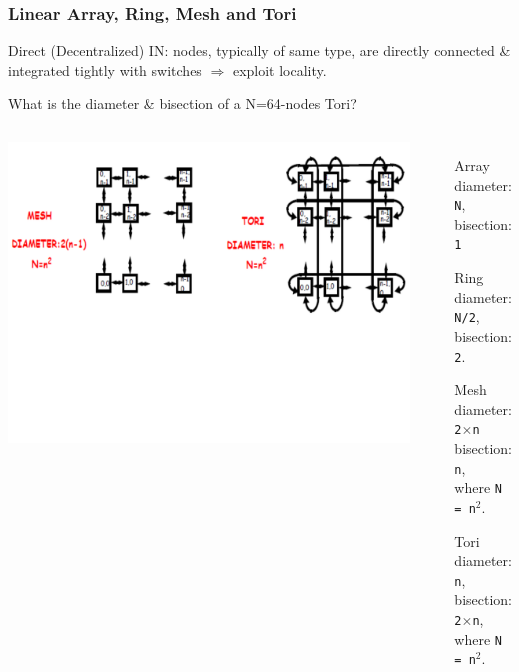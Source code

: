 \documentclass{beamer}
\renewcommand{\emph}[1]{\textcolor{structure}{#1}}
\newcommand{\emp}[1]{\textcolor{DikuRed}{ #1}}
\begin{document}
\begin{frame}[fragile,t]
\frametitle{Linear Array, Ring, Mesh and Tori}

\emp{Direct (Decentralized) IN}: nodes, typically of same type, are directly 
connected \& integrated tightly with switches $\Rightarrow$ \emph{exploit locality}.

\medskip
\alert{What is the diameter \& bisection of a N=64-nodes Tori?}

\begin{columns}
\vspace{-2ex}
\vspace{-11ex}

\includegraphics[width=44ex]{Figures/FigsInterconnect/MeshTori}\pause
{}
\vspace{-10ex}
\begin{itemize}
    \item[Array] diameter: {\tt N},\\ bisection: {\tt 1}\medskip
    \item[Ring]  diameter: {\tt N/2},\\ bisection: {\tt 2}.\bigskip
    \item[Mesh]  diameter: {\tt 2$\times$n}\\ bisection: {\tt n},\\ where {\tt N = n$^2$}.\medskip 
    \item[Tori]  diameter: {\tt n},\\ bisection: {\tt 2$\times$n},\\ where {\tt N = n$^2$}.\medskip
\end  {itemize}
\end{columns}

\end{frame}
\end{document}

